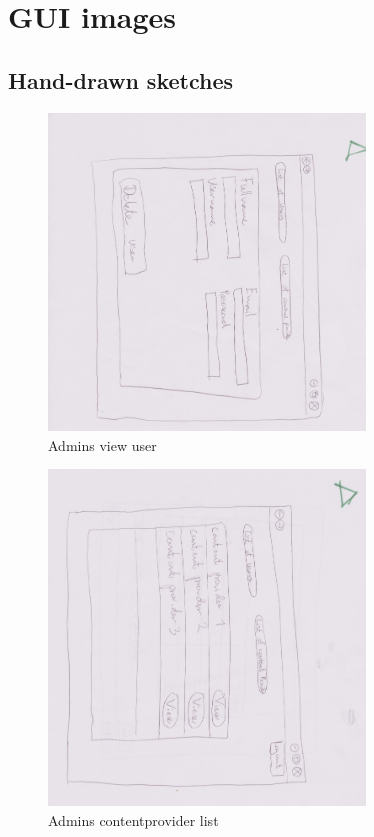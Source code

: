 \chapter{GUI images}
\label{Appendix_GUI}

\section{Hand-drawn sketches}
\label{Appendix_GUI_sketches}

\begin{figure}[!ht]
  \centering
    \includegraphics[width=0.75\textwidth]{Parts/Appendix/Images/PaperMockup/AdminViewUser}
  \caption{Admins view user}
  \label{fig:Appendix_GUI_sketches_AdminViewUser}
\end{figure}


\begin{figure}[!ht]
  \centering
    \includegraphics[width=0.75\textwidth]{Parts/Appendix/Images/PaperMockup/AdminListofCPs}
  \caption{Admins contentprovider list}
  \label{fig:Appendix_GUI_sketches_AdminListofCP}
\end{figure}

